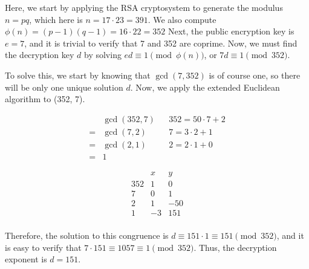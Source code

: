 \documentclass{article}
\begin{document}
Here, we start by applying the RSA cryptosystem to generate the modulus $n = pq$, which here is $n = 17 \cdot 23 = 391$. We also compute $\phi(n) = (p - 1)(q - 1) = 16 \cdot 22 = 352$ Next, the public encryption key is $e=7$, and it is trivial to verify that 7 and 352 are coprime. Now, we must find the decryption key $d$ by solving $ed \equiv 1 \pmod{\phi(n)}$, or $7d \equiv 1 \pmod{352}$.

To solve this, we start by knowing that $\gcd(7, 352)$ is of course one, so there will be only one unique solution $d$. Now, we apply the extended Euclidean algorithm to (352, 7).

\begin{align*}
    & \gcd(352,7) & & 352 = 50 \cdot 7 + 2 \\
    = & \gcd(7,2) & & 7 = 3 \cdot 2 + 1 \\
    = & \gcd(2, 1) & & 2 = 2 \cdot 1 + 0 \\
    = & 1
\end{align*}

$$
\begin{matrix}
  & x & y\\
352 & 1 & 0 \\
7 & 0 & 1 \\
2 & 1 & -50 \\
1 & -3 & 151 \\
\end{matrix}
$$

Therefore, the solution to this congruence is $d \equiv 151 \cdot 1 \equiv 151 \pmod{352}$, and it is easy to verify that $7 \cdot 151 \equiv 1057 \equiv 1 \pmod{352}$. Thus, the decryption exponent is $d=151$.
\end{document}
